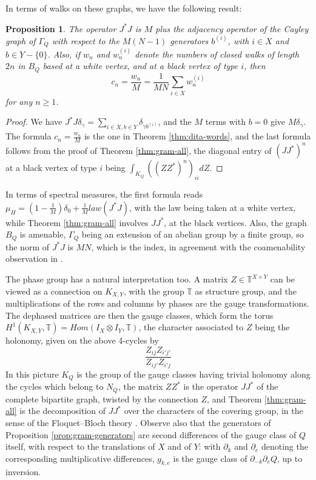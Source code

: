 \documentclass[11pt,reqno]{amsart}
\newtheorem{prop}[thm]{Proposition}
\theoremstyle{definition}
\numberwithin{equation}{section}
\begin{document}
In terms of walks on these graphs, we have the following result:

\begin{prop}\label{prop:covering-walks}
The operator $J^*J$ is $M$ plus the adjacency operator of the Cayley graph of $\Gamma_Q$ with respect to the $M(N-1)$ generators $b^{(i)}$, with $i\in X$ and $b\in Y-\{0\}$. Also, if $w_n$ and $w_n^{(i)}$ denote the numbers of closed walks of length $2n$ in $B_Q$ based at a white vertex, and at a black vertex of type $i$, then
$$c_n=\frac{w_n}M=\frac1{MN}\sum_{i\in X}w_n^{(i)}$$
for any $n\geq1$.
\end{prop}

\begin{proof}
We have $J^*J\delta_\gamma=\sum_{i\in X,b\in Y}\delta_{\gamma b^{(i)}}$, and the $M$ terms with $b=0$ give $M\delta_\gamma$. The formula $c_n=\frac{w_n}M$ is the one in Theorem \ref{thm:dita-words}, and the last formula follows from the proof of Theorem \ref{thm:gram-all}, the diagonal entry of $(JJ^*)^n$ at a black vertex of type $i$ being $\int_{K_Q}((ZZ^*)^n)_{ii}dZ$.
\end{proof}

In terms of spectral measures, the first formula reads $\mu_H=(1-\frac1M)\delta_0+\frac1M law(J^*J)$, with the law being taken at a white vertex, while Theorem \ref{thm:gram-all} involves $JJ^*$, at the black vertices. Also, the graph $B_Q$ is amenable, $\Gamma_Q$ being an extension of an abelian group by a finite group, so the norm of $J^*J$ is $MN$, which is the index, in agreement with the coamenability observation in \cite{BO26}.

The phase group has a natural interpretation too. A matrix $Z\in\mathbb T^{X\times Y}$ can be viewed as a connection on $K_{X,Y}$, with the group $\mathbb T$ as structure group, and the multiplications of the rows and columns by phases are the gauge transformations. The dephased matrices are then the gauge classes, which form the torus $H^1(K_{X,Y},\mathbb T)=Hom(I_X\otimes I_Y,\mathbb T)$, the character associated to $Z$ being the holonomy, given on the above 4-cycles by
$$\frac{Z_{ij}Z_{i'j'}}{Z_{ij'}Z_{i'j}}$$
In this picture $K_Q$ is the group of the gauge classes having trivial holonomy along the cycles which belong to $N_Q$, the matrix $ZZ^*$ is the operator $JJ^*$ of the complete bipartite graph, twisted by the connection $Z$, and Theorem \ref{thm:gram-all} is the decomposition of $JJ^*$ over the characters of the covering group, in the sense of the Floquet--Bloch theory \cite{KS01,Sun13}. Observe also that the generators of Proposition \ref{prop:gram-generators} are second differences of the gauge class of $Q$ itself, with respect to the translations of $X$ and of $Y$: with $\partial_k$ and $\partial_e$ denoting the corresponding multiplicative differences, $g_{k,e}$ is the gauge class of $\partial_{-k}\partial_eQ$, up to inversion.
\end{document}
